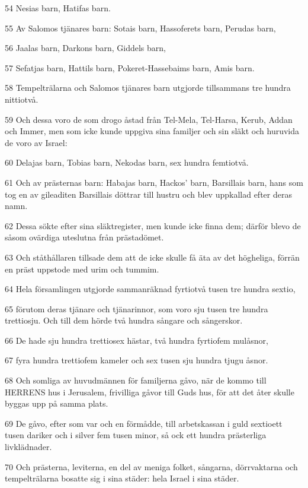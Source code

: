 \par 54 Nesias barn, Hatifas barn.
\par 55 Av Salomos tjänares barn: Sotais barn, Hassoferets barn, Perudas barn,
\par 56 Jaalas barn, Darkons barn, Giddels barn,
\par 57 Sefatjas barn, Hattils barn, Pokeret-Hassebaims barn, Amis barn.
\par 58 Tempelträlarna och Salomos tjänares barn utgjorde tillsammans tre hundra nittiotvå.
\par 59 Och dessa voro de som drogo åstad från Tel-Mela, Tel-Harsa, Kerub, Addan och Immer, men som icke kunde uppgiva sina familjer och sin släkt och huruvida de voro av Israel:
\par 60 Delajas barn, Tobias barn, Nekodas barn, sex hundra femtiotvå.
\par 61 Och av prästernas barn: Habajas barn, Hackos' barn, Barsillais barn, hans som tog en av gileaditen Barsillais döttrar till hustru och blev uppkallad efter deras namn.
\par 62 Dessa sökte efter sina släktregister, men kunde icke finna dem; därför blevo de såsom ovärdiga uteslutna från prästadömet.
\par 63 Och ståthållaren tillsade dem att de icke skulle få äta av det högheliga, förrän en präst uppstode med urim och tummim.
\par 64 Hela församlingen utgjorde sammanräknad fyrtiotvå tusen tre hundra sextio,
\par 65 förutom deras tjänare och tjänarinnor, som voro sju tusen tre hundra trettiosju. Och till dem hörde två hundra sångare och sångerskor.
\par 66 De hade sju hundra trettiosex hästar, två hundra fyrtiofem mulåsnor,
\par 67 fyra hundra trettiofem kameler och sex tusen sju hundra tjugu åsnor.
\par 68 Och somliga av huvudmännen för familjerna gåvo, när de kommo till HERRENS hus i Jerusalem, frivilliga gåvor till Guds hus, för att det åter skulle byggas upp på samma plats.
\par 69 De gåvo, efter som var och en förmådde, till arbetskassan i guld sextioett tusen dariker och i silver fem tusen minor, så ock ett hundra prästerliga livklädnader.
\par 70 Och prästerna, leviterna, en del av meniga folket, sångarna, dörrvaktarna och tempelträlarna bosatte sig i sina städer: hela Israel i sina städer.


